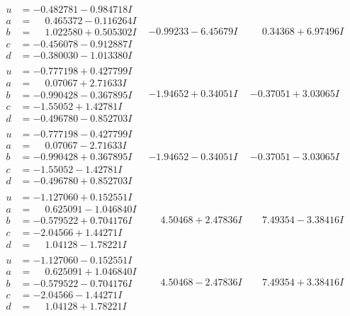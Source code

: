 \documentclass[1p]{elsarticle_modified}
\theoremstyle{definition}
\begin{document}
$$\begin{array}{c|c|c}
\begin{aligned}
u &= -0.482781 - 0.984718 I \\
a &= \phantom{-}0.465372 - 0.116264 I \\
b &= \phantom{-}1.022580 + 0.505302 I \\
c &= -0.456078 - 0.912887 I \\
d &= -0.380030 - 1.013380 I\end{aligned}
 & -0.99233 - 6.45679 I & \phantom{-}0.34368 + 6.97496 I \\ \hline\begin{aligned}
u &= -0.777198 + 0.427799 I \\
a &= \phantom{-}0.07067 + 2.71633 I \\
b &= -0.990428 - 0.367895 I \\
c &= -1.55052 + 1.42781 I \\
d &= -0.496780 - 0.852703 I\end{aligned}
 & -1.94652 + 0.34051 I & -0.37051 + 3.03065 I \\ \hline\begin{aligned}
u &= -0.777198 - 0.427799 I \\
a &= \phantom{-}0.07067 - 2.71633 I \\
b &= -0.990428 + 0.367895 I \\
c &= -1.55052 - 1.42781 I \\
d &= -0.496780 + 0.852703 I\end{aligned}
 & -1.94652 - 0.34051 I & -0.37051 - 3.03065 I \\ \hline\begin{aligned}
u &= -1.127060 + 0.152551 I \\
a &= \phantom{-}0.625091 - 1.046840 I \\
b &= -0.579522 + 0.704176 I \\
c &= -2.04566 + 1.44271 I \\
d &= \phantom{-}1.04128 - 1.78221 I\end{aligned}
 & \phantom{-}4.50468 + 2.47836 I & \phantom{-}7.49354 - 3.38416 I \\ \hline\begin{aligned}
u &= -1.127060 - 0.152551 I \\
a &= \phantom{-}0.625091 + 1.046840 I \\
b &= -0.579522 - 0.704176 I \\
c &= -2.04566 - 1.44271 I \\
d &= \phantom{-}1.04128 + 1.78221 I\end{aligned}
 & \phantom{-}4.50468 - 2.47836 I & \phantom{-}7.49354 + 3.38416 I\\

\end{array}$$
\end{document}
